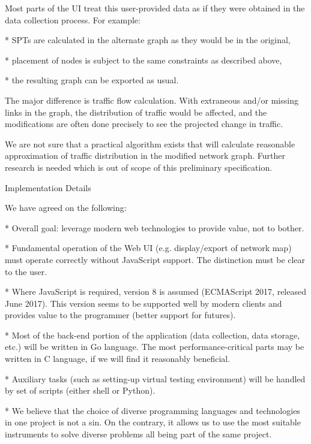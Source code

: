 Most parts of the UI treat this user-provided data as if they were obtained in
the data collection process. For example:

\begitems

* SPTs are calculated in the alternate graph as they would be in the original,

* placement of nodes is subject to the same constraints as described above,

* the resulting graph can be exported as usual.

\enditems

The major difference is traffic flow calculation. With extraneous and/or
missing links in the graph, the distribution of traffic would be affected, and
the modifications are often done precisely to see the projected change in
traffic.

We are not sure that a practical algorithm exists that will calculate reasonable
approximation of traffic distribution in the modified network graph. Further
research is needed which is out of scope of this preliminary specification.

\secc Implementation Details

We have agreed on the following:

\begitems

* Overall goal: leverage modern web technologies to provide value, not to bother.

* Fundamental operation of the Web UI (e.g. display/export of network map) must
operate correctly without JavaScript support. The distinction must be clear to
the user.

* Where JavaScript is required, version 8 is assumed (ECMAScript 2017, released
June 2017). This version seems to be supported well by modern clients and
provides value to the programmer (better support for futures).

* Most of the back-end portion of the application (data collection, data
storage, etc.) will be written in Go language. The most performance-critical
parts may be written in C language, if we will find it reasonably beneficial.

* Auxiliary tasks (such as setting-up virtual testing environment) will be
handled by set of scripts (either shell or Python).

* We believe that the choice of diverse programming languages and technologies
in one project is not a sin. On the contrary, it allows us to use the most
suitable instruments to solve diverse problems all being part of the same
project.

\enditems

\bye
